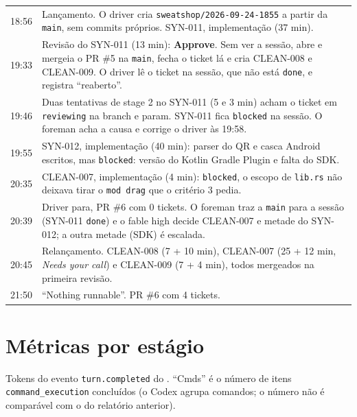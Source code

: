 \documentclass[11pt,a4paper]{article}
\begin{document}
\begin{tabularx}{\linewidth}{@{}lX@{}}
\toprule
18:56 & Lançamento. O driver cria \texttt{sweatshop/2026-09-24-1855} a partir
        da \texttt{main}, sem commits próprios. SYN-011, implementação (37 min).\\
19:33 & Revisão do SYN-011 (13 min): \textbf{Approve}. Sem ver a sessão, abre e
        mergeia o PR \#5 na \texttt{main}, fecha o ticket lá e cria
        CLEAN-008 e CLEAN-009. O driver lê o ticket na sessão, que não está
        \texttt{done}, e registra ``reaberto''.\\
19:46 & Duas tentativas de stage 2 no SYN-011 (5 e 3 min) acham o ticket em
        \texttt{reviewing} na branch e param. SYN-011 fica \texttt{blocked} na
        sessão. O foreman acha a causa e corrige o driver às 19:58.\\
19:55 & SYN-012, implementação (40 min): parser do QR e casca Android escritos,
        mas \texttt{blocked}: versão do Kotlin Gradle Plugin e falta do SDK.\\
20:35 & CLEAN-007, implementação (4 min): \texttt{blocked}, o escopo de
        \texttt{lib.rs} não deixava tirar o \texttt{mod drag} que o critério 3
        pedia.\\
20:39 & Driver para, PR \#6 com 0 tickets. O foreman traz a \texttt{main} para
        a sessão (SYN-011 \texttt{done}) e o fable high decide CLEAN-007 e
        metade do SYN-012; a outra metade (SDK) é escalada.\\
20:45 & Relançamento. CLEAN-008 (7 + 10 min), CLEAN-007 (25 + 12 min, \emph{Needs
        your call}) e CLEAN-009 (7 + 4 min), todos mergeados na primeira
        revisão.\\
21:50 & ``Nothing runnable''. PR \#6 com 4 tickets.\\
\bottomrule
\end{tabularx}

\section{Métricas por estágio}

Tokens do evento \texttt{turn.completed} do .
``Cmds'' é o número de itens \texttt{command\_execution} concluídos (o Codex
agrupa comandos; o número não é comparável com o do relatório anterior).
\end{document}
